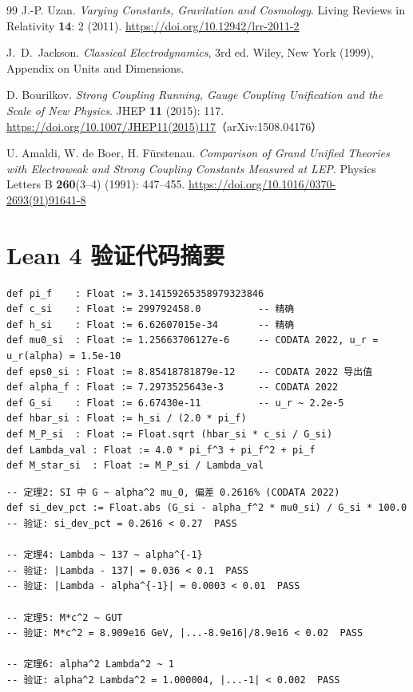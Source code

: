 \documentclass[12pt,a4paper]{article}
\begin{document}
\begin{thebibliography}{99}
J.-P. Uzan.
\textit{Varying Constants, Gravitation and Cosmology}.
Living Reviews in Relativity \textbf{14}: 2 (2011).
\url{https://doi.org/10.12942/lrr-2011-2}

J.~D.~Jackson.
\textit{Classical Electrodynamics}, 3rd ed.
Wiley, New York (1999), Appendix on Units and Dimensions.


D. Bourilkov.
\textit{Strong Coupling Running, Gauge Coupling Unification and the Scale of New Physics}.
JHEP \textbf{11} (2015): 117.
\url{https://doi.org/10.1007/JHEP11(2015)117}（arXiv:1508.04176）

U. Amaldi, W. de Boer, H. F\"urstenau.
\textit{Comparison of Grand Unified Theories with Electroweak and Strong Coupling Constants Measured at LEP}.
Physics Letters B \textbf{260}(3--4) (1991): 447--455.
\url{https://doi.org/10.1016/0370-2693(91)91641-8}
\end{thebibliography}


\appendix
\section{Lean 4 验证代码摘要}

\begin{lstlisting}[language={},caption={物理常数定义（CODATA 2022）}]
def pi_f    : Float := 3.14159265358979323846
def c_si    : Float := 299792458.0          -- 精确
def h_si    : Float := 6.62607015e-34       -- 精确
def mu0_si  : Float := 1.25663706127e-6     -- CODATA 2022, u_r = u_r(alpha) = 1.5e-10
def eps0_si : Float := 8.85418781879e-12    -- CODATA 2022 导出值
def alpha_f : Float := 7.2973525643e-3      -- CODATA 2022
def G_si    : Float := 6.67430e-11          -- u_r ~ 2.2e-5
def hbar_si : Float := h_si / (2.0 * pi_f)
def M_P_si  : Float := Float.sqrt (hbar_si * c_si / G_si)
def Lambda_val : Float := 4.0 * pi_f^3 + pi_f^2 + pi_f
def M_star_si  : Float := M_P_si / Lambda_val
\end{lstlisting}

\begin{lstlisting}[language={},caption={核心验证断言}]
-- 定理2: SI 中 G ~ alpha^2 mu_0, 偏差 0.2616% (CODATA 2022)
def si_dev_pct := Float.abs (G_si - alpha_f^2 * mu0_si) / G_si * 100.0
-- 验证: si_dev_pct = 0.2616 < 0.27  PASS

-- 定理4: Lambda ~ 137 ~ alpha^{-1}
-- 验证: |Lambda - 137| = 0.036 < 0.1  PASS
-- 验证: |Lambda - alpha^{-1}| = 0.0003 < 0.01  PASS

-- 定理5: M*c^2 ~ GUT
-- 验证: M*c^2 = 8.909e16 GeV, |...-8.9e16|/8.9e16 < 0.02  PASS

-- 定理6: alpha^2 Lambda^2 ~ 1
-- 验证: alpha^2 Lambda^2 = 1.000004, |...-1| < 0.002  PASS
\end{lstlisting}
\end{document}
